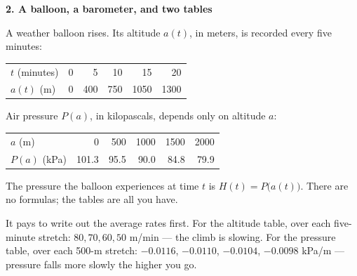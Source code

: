 \documentclass[11pt]{article}
\newenvironment{statement}{\par\color{gray!55!black}}{\par\medskip}
\newcommand{\prob}[1]{\bigskip\noindent\textbf{\large #1}\par\smallskip}
\begin{document}
\prob{2. A balloon, a barometer, and two tables}

\begin{statement}
A weather balloon rises. Its altitude $a(t)$, in meters, is recorded every five minutes:
\begin{center}
\begin{tabular}{@{}lrrrrr@{}}
\toprule
$t$ (minutes) & 0 & 5 & 10 & 15 & 20\\
$a(t)$ (m) & 0 & 400 & 750 & 1050 & 1300\\
\bottomrule
\end{tabular}
\end{center}
Air pressure $P(a)$, in kilopascals, depends only on altitude $a$:
\begin{center}
\begin{tabular}{@{}lrrrrr@{}}
\toprule
$a$ (m) & 0 & 500 & 1000 & 1500 & 2000\\
$P(a)$ (kPa) & 101.3 & 95.5 & 90.0 & 84.8 & 79.9\\
\bottomrule
\end{tabular}
\end{center}
The pressure the balloon experiences at time $t$ is $H(t)=P\big(a(t)\big)$. There are no formulas; the tables are all you have.
\end{statement}
It pays to write out the average rates first. For the altitude table, over each
five-minute stretch: $80, 70, 60, 50$ m/min --- the climb is slowing. For the pressure
table, over each 500-m stretch: $-0.0116$, $-0.0110$, $-0.0104$, $-0.0098$ kPa/m --- pressure
falls more slowly the higher you go.
\end{document}
